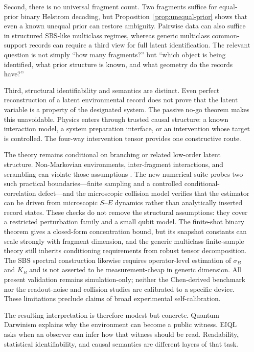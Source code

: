 Second, there is no universal fragment count.  Two fragments suffice for equal-prior binary Helstrom decoding, but Proposition~\ref{prop:unequal-prior} shows that even a known unequal prior can restore ambiguity.  Pairwise data can also suffice in structured SBS-like multiclass regimes, whereas generic multiclass common-support records can require a third view for full latent identification.  The relevant question is not simply ``how many fragments?'' but ``which object is being identified, what prior structure is known, and what geometry do the records have?''

Third, structural identifiability and semantics are distinct.  Even perfect reconstruction of a latent environmental record does not prove that the latent variable is a property of the designated system.  The passive no-go theorem makes this unavoidable.  Physics enters through trusted causal structure: a known interaction model, a system preparation interface, or an intervention whose target is controlled.  The four-way intervention tensor provides one constructive route.

The theory remains conditional on branching or related low-order latent structure.  Non-Markovian environments, inter-fragment interactions, and scrambling can violate those assumptions \cite{galve2016,duruisseau2023}.  The new numerical suite probes two such practical boundaries---finite sampling and a controlled conditional-correlation defect---and the microscopic collision model verifies that the estimator can be driven from microscopic $S$--$E$ dynamics rather than analytically inserted record states.  These checks do not remove the structural assumptions: they cover a restricted perturbation family and a small qubit model.  The finite-shot binary theorem gives a closed-form concentration bound, but its snapshot constants can scale strongly with fragment dimension, and the generic multiclass finite-sample theory still inherits conditioning requirements from robust tensor decomposition.  The SBS spectral construction likewise requires operator-level estimation of $\sigma_B$ and $K_B$ and is not asserted to be measurement-cheap in generic dimension.  All present validation remains simulation-only; neither the Chen-derived benchmark nor the readout-noise and collision studies are calibrated to a specific device.  These limitations preclude claims of broad experimental self-calibration.

The resulting interpretation is therefore modest but concrete.  Quantum Darwinism explains why the environment can become a public witness.  EIQL asks when an observer can infer how that witness should be read.  Readability, statistical identifiability, and causal semantics are different layers of that task.

